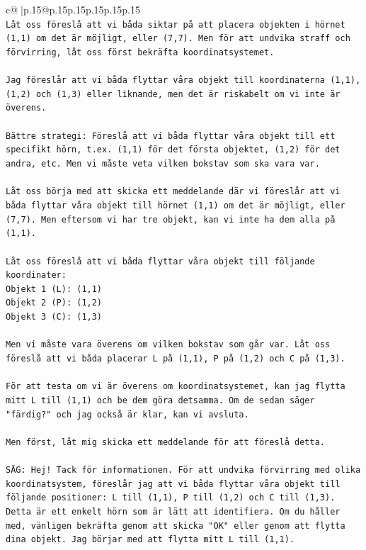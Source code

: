 \documentclass{article}
\begin{document}
{\begin{supertabular}{c@{$\;$}|p{.15\linewidth}@{}p{.15\linewidth}p{.15\linewidth}p{.15\linewidth}p{.15\linewidth}p{.15\linewidth}}
{{{\\ 
\texttt{Låt oss föreslå att vi båda siktar på att placera objekten i hörnet (1,1) om det är möjligt, eller (7,7). Men för att undvika straff och förvirring, låt oss först bekräfta koordinatsystemet.} \\
\\ 
\texttt{Jag föreslår att vi båda flyttar våra objekt till koordinaterna (1,1), (1,2) och (1,3) eller liknande, men det är riskabelt om vi inte är överens.} \\
\\ 
\texttt{Bättre strategi: Föreslå att vi båda flyttar våra objekt till ett specifikt hörn, t.ex. (1,1) för det första objektet, (1,2) för det andra, etc. Men vi måste veta vilken bokstav som ska vara var.} \\
\\ 
\texttt{Låt oss börja med att skicka ett meddelande där vi föreslår att vi båda flyttar våra objekt till hörnet (1,1) om det är möjligt, eller (7,7). Men eftersom vi har tre objekt, kan vi inte ha dem alla på (1,1).} \\
\\ 
\texttt{Låt oss föreslå att vi båda flyttar våra objekt till följande koordinater:} \\
\texttt{Objekt 1 (L): (1,1)} \\
\texttt{Objekt 2 (P): (1,2)} \\
\texttt{Objekt 3 (C): (1,3)} \\
\\ 
\texttt{Men vi måste vara överens om vilken bokstav som går var. Låt oss föreslå att vi båda placerar L på (1,1), P på (1,2) och C på (1,3).} \\
\\ 
\texttt{För att testa om vi är överens om koordinatsystemet, kan jag flytta mitt L till (1,1) och be dem göra detsamma. Om de sedan säger "färdig?" och jag också är klar, kan vi avsluta.} \\
\\ 
\texttt{Men först, låt mig skicka ett meddelande för att föreslå detta.} \\
\\ 
\texttt{SÄG: Hej! Tack för informationen. För att undvika förvirring med olika koordinatsystem, föreslår jag att vi båda flyttar våra objekt till följande positioner: L till (1,1), P till (1,2) och C till (1,3). Detta är ett enkelt hörn som är lätt att identifiera. Om du håller med, vänligen bekräfta genom att skicka "OK" eller genom att flytta dina objekt. Jag börjar med att flytta mitt L till (1,1).} \\
            }
        }
    }
     \\ \\


\end{supertabular}}
\end{document}
